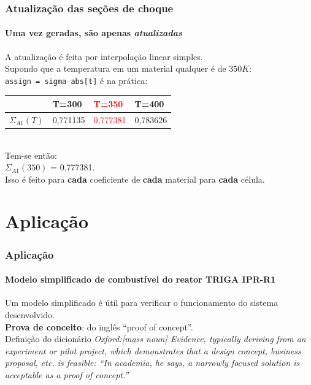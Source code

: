 \documentclass[svgnames,smaller,table]{beamer}
\begin{document}
\begin{frame}
  \frametitle{Atualização das seções de choque}
  \framesubtitle{Uma vez geradas, são apenas \textit{atualizadas}}
  A atualização é feita por interpolação linear simples.
  \\
  \vspace{0.2cm}
  Supondo que a temperatura em um material qualquer é de $350K$:
  \\
  \vspace{0.2cm}
  \texttt{assign = sigma abs[t]} é na prática:
  \centering
  \\
  \vspace{0.2cm}
  \begin{tabular}{llll}
                 & T=300  & \textcolor{red}{T=350} & T=400 \\ \hline
    $\Sigma_{A1}(T)$ & 0,771135       & \textcolor{red}{0,777381}         & 0,783626      
  \end{tabular}
  \\
  \vspace{0.2cm}
  Tem-se então:
  \\
  \vspace{0.2cm}
  $\Sigma_{A1}(350)$ = 0,777381.
  \\
  \vspace{0.2cm}
  Isso é feito para \textbf{cada} coeficiente de \textbf{cada} material para \textbf{cada} célula.
\end{frame}




\section{Aplicação}
\begin{frame}
  \frametitle{Aplicação}
  \framesubtitle{Modelo \textbf{simplificado} de combustível do reator TRIGA IPR-R1}
  \vspace{0.2cm}
  \raggedright
  Um modelo simplificado é útil para verificar o funcionamento do sistema desenvolvido.
  \\
  \vspace{0.2cm}
  \textbf{Prova de conceito}: do inglês ``proof of concept''.
  \\
  \vspace{0.2cm}
  Definição do dicionário \textit{Oxford:[mass noun] Evidence, typically deriving from an experiment or pilot project, which demonstrates that a design concept, business proposal, etc. is feasible: ``In academia, he says, a narrowly focused solution is acceptable as a proof of concept.''}
\end{frame}
\end{document}
